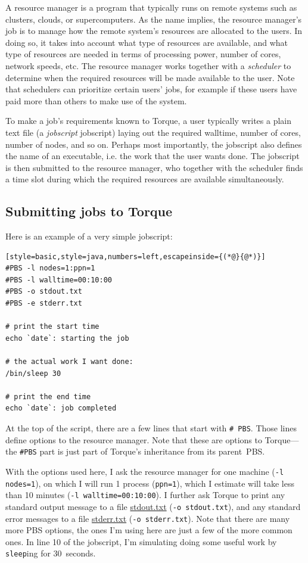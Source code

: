 \documentclass[12pt, a4paper, twoside, openany, titlepage]{book}
\begin{document}
A resource manager is a program that typically runs on remote systems such
as clusters, clouds, or supercomputers. As the name implies, the resource
manager's job is to manage how the remote system's resources are allocated
to the users. In doing so, it takes into account what type of resources are
available, and what type of resources are needed in terms of processing
power, number of cores, network speeds, etc. The resource manager works
together with a \textit{scheduler} to determine when the
required resources will be made available to the user. Note that schedulers
can prioritize certain users' jobs, for example if these users have paid
more than others to make use of the system.

To make a job's requirements known to Torque, a user typically writes a
plain text file (a \textit{jobscript}\index
{jobscript}) laying out the required walltime, number of cores, number of
nodes, and so on. Perhaps most importantly, the jobscript also defines the
name of an executable, i.e. the work that the user wants done. The jobscript
is then submitted to the resource manager, who together with the scheduler
finds a time slot during which the required resources are available
simultaneously.

\clearpage
\subsection{Submitting jobs to Torque}

Here is an example of a very simple jobscript:
\begin{lstlisting}[style=basic,style=java,numbers=left,escapeinside={(*@}{@*)}]
#PBS -l nodes=1:ppn=1
#PBS -l walltime=00:10:00
#PBS -o stdout.txt
#PBS -e stderr.txt

# print the start time
echo `date`: starting the job

# the actual work I want done:
/bin/sleep 30

# print the end time
echo `date`: job completed
\end{lstlisting}


At the top of the script, there are a few lines that start with \texttt{\#
PBS}. Those lines define options to the resource manager. Note that these
are options to Torque---the \texttt{\#PBS} part is just part of Torque's
inheritance from its parent~PBS.

With the options used here, I ask the resource manager for one machine \mbox
{(\texttt{-l nodes=1})}, on which I will run 1 process (\texttt{ppn=1}),
which I estimate will take less than 10 minutes (\texttt{-l
walltime=00:10:00}). I further ask Torque to print any standard output
message to a file \url{stdout.txt} (\texttt{-o stdout.txt}), and any
standard error messages to a file \url{stderr.txt} (\texttt{-o stderr.txt}).
Note that there are many more PBS options, the ones I'm using here are just
a few of the more common ones. In line 10 of the jobscript, I'm simulating
doing some useful work by \texttt{sleep}ing for 30~seconds.
\end{document}
